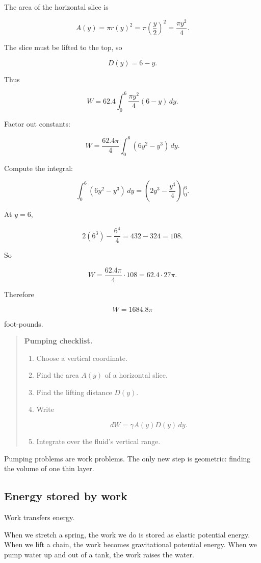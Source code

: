 The area of the horizontal slice is

\[
A(y)=\pi r(y)^2
=
\pi\left(\frac{y}{2}\right)^2
=
\frac{\pi y^2}{4}.
\]

The slice must be lifted to the top, so

\[
D(y)=6-y.
\]

Thus

\[
W=62.4\int_0^6 \frac{\pi y^2}{4}(6-y)\,dy.
\]

Factor out constants:

\[
W=\frac{62.4\pi}{4}\int_0^6 (6y^2-y^3)\,dy.
\]

Compute the integral:

\[
\int_0^6 (6y^2-y^3)\,dy
=
\left(2y^3-\frac{y^4}{4}\right)\Big|_0^6.
\]

At \(y=6\),

\[
2(6^3)-\frac{6^4}{4}
=
432-324
=
108.
\]

So

\[
W=\frac{62.4\pi}{4}\cdot108
=
62.4\cdot27\pi.
\]

Therefore

\[
\boxed{
W=1684.8\pi
}
\]

foot-pounds.

\begin{quote}
\textbf{Pumping checklist.}

\begin{enumerate}
\item Choose a vertical coordinate.
\item Find the area \(A(y)\) of a horizontal slice.
\item Find the lifting distance \(D(y)\).
\item Write

\[
dW=\gamma A(y)D(y)\,dy.
\]

\item Integrate over the fluid's vertical range.
\end{enumerate}
\end{quote}

Pumping problems are work problems.  The only new step is geometric: finding the
volume of one thin layer.

\subsection{Energy stored by work}
\label{subsec:energy-stored-by-work}

Work transfers energy.

When we stretch a spring, the work we do is stored as elastic potential energy.  When we
lift a chain, the work becomes gravitational potential energy.  When we pump water up
and out of a tank, the work raises the water.

